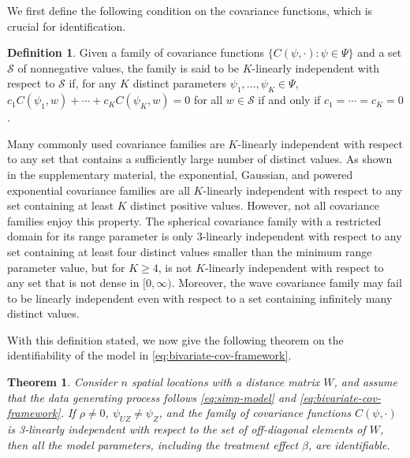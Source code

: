 \documentclass[11pt]{article}
\newtheorem{theorem}{Theorem}
\theoremstyle{definition}
\newtheorem{definition}{Definition}
\theoremstyle{remark}
\begin{document}
We first define the following condition on the covariance functions, which is crucial for identification.
\begin{definition}\label{defn:k-linear-independence}
Given a family of covariance functions $\{C(\psi, \cdot): \psi \in \Psi\}$ and a set $\mathcal{S}$ of 
nonnegative
values, the family is said to be $K$-linearly independent with respect to $\mathcal{S}$ if, for any $K$ distinct parameters $\psi_1, \ldots, \psi_K \in \Psi$, $c_1 C(\psi_1, w) + \cdots + c_K C(\psi_K, w) = 0$ for all $w \in \mathcal{S}$ if and only if $c_1 = \cdots = c_K = 0$.
\end{definition}
Many commonly used covariance families are $K$-linearly independent with respect to any set that contains a sufficiently large number of distinct values. As shown in the supplementary material, the exponential, Gaussian, and powered exponential covariance families are all $K$-linearly independent with respect to any set containing at least $K$ distinct positive values. However, not all covariance families enjoy this property. The spherical covariance family with a restricted domain for its range parameter is only 3-linearly independent with respect to any set containing at least four distinct values smaller than the minimum range parameter value, but for $K\ge 4$, is not $K$-linearly independent with respect to any set that is not dense in $[0, \infty)$. Moreover, the wave covariance family may fail to be linearly independent even with respect to a set containing infinitely many distinct values.



With this definition stated, we now give the following theorem on the identifiability of the model in \eqref{eq:bivariate-cov-framework}.


\begin{theorem}\label{thm:flexible-bivariate-id}
Consider $n$ spatial locations with a distance matrix $W$, 
and assume that the data generating process follows \eqref{eq:simp-model} and \eqref{eq:bivariate-cov-framework}. 
If  $\rho \neq 0$, $\psi_{UZ} \ne \psi_Z$,
and 
the family of covariance functions $C(\psi, \cdot)$ is 3-linearly independent with respect to the set of off-diagonal elements of $W$, 
then all the model parameters, including the treatment effect $\beta$, 
are identifiable. 
\end{theorem} 
\end{document}
